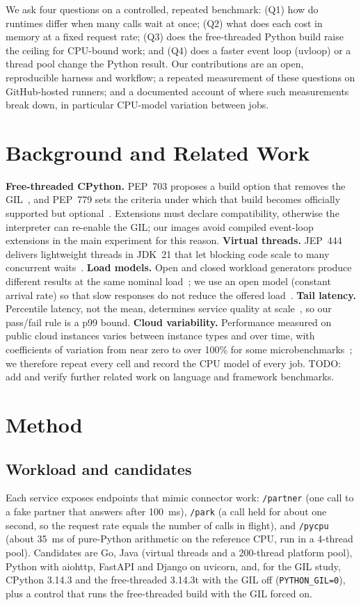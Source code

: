 \documentclass[journal]{IEEEtran}
\begin{document}
We ask four questions on a controlled, repeated benchmark: (Q1) how do runtimes differ when many calls wait at once; (Q2) what does each cost in memory at a fixed request rate; (Q3) does the free-threaded Python build raise the ceiling for CPU-bound work; and (Q4) does a faster event loop (uvloop) or a thread pool change the Python result. Our contributions are an open, reproducible harness and workflow; a repeated measurement of these questions on GitHub-hosted runners; and a documented account of where such measurements break down, in particular CPU-model variation between jobs.

\section{Background and Related Work}
\textbf{Free-threaded CPython.} PEP~703 proposes a build option that removes the GIL~\cite{pep703}, and PEP~779 sets the criteria under which that build becomes officially supported but optional~\cite{pep779}. Extensions must declare compatibility, otherwise the interpreter can re-enable the GIL; our images avoid compiled event-loop extensions in the main experiment for this reason. \textbf{Virtual threads.} JEP~444 delivers lightweight threads in JDK~21 that let blocking code scale to many concurrent waits~\cite{jep444}. \textbf{Load models.} Open and closed workload generators produce different results at the same nominal load~\cite{schroeder2006open}; we use an open model (constant arrival rate) so that slow responses do not reduce the offered load~\cite{k6}. \textbf{Tail latency.} Percentile latency, not the mean, determines service quality at scale~\cite{dean2013tail}, so our pass/fail rule is a p99 bound. \textbf{Cloud variability.} Performance measured on public cloud instances varies between instance types and over time, with coefficients of variation from near zero to over 100\% for some microbenchmarks~\cite{laaber2019microbenchmarking}; we therefore repeat every cell and record the CPU model of every job. TODO: add and verify further related work on language and framework benchmarks.

\section{Method}
\subsection{Workload and candidates}
Each service exposes endpoints that mimic connector work: \texttt{/partner} (one call to a fake partner that answers after 100~ms), \texttt{/park} (a call held for about one second, so the request rate equals the number of calls in flight), and \texttt{/pycpu} (about 35~ms of pure-Python arithmetic on the reference CPU, run in a 4-thread pool). Candidates are Go, Java (virtual threads and a 200-thread platform pool), Python with aiohttp, FastAPI and Django on uvicorn, and, for the GIL study, CPython 3.14.3 and the free-threaded 3.14.3t with the GIL off (\texttt{PYTHON\_GIL=0}), plus a control that runs the free-threaded build with the GIL forced on.
\end{document}
